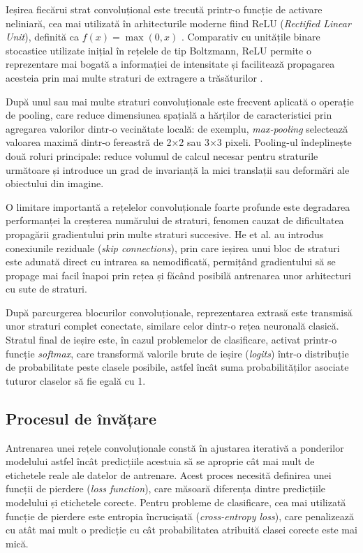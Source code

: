 Ieșirea fiecărui strat convoluțional este trecută printr-o funcție de activare neliniară, cea mai utilizată în arhitecturile moderne fiind ReLU (\textit{Rectified Linear Unit}), definită ca $f(x) = \max(0, x)$ \cite{nair2010rectified}. Comparativ cu unitățile binare stocastice utilizate inițial în rețelele de tip Boltzmann, ReLU permite o reprezentare mai bogată a informației de intensitate și facilitează propagarea acesteia prin mai multe straturi de extragere a trăsăturilor \cite{nair2010rectified}.

După unul sau mai multe straturi convoluționale este frecvent aplicată o operație de pooling, care reduce dimensiunea spațială a hărților de caracteristici prin agregarea valorilor dintr-o vecinătate locală: de exemplu, {\it max-pooling} selectează valoarea maximă dintr-o fereastră de 2×2 sau 3×3 pixeli. Pooling-ul îndeplinește două roluri principale: reduce volumul de calcul necesar pentru straturile următoare și introduce un grad de invarianță la mici translații sau deformări ale obiectului din imagine.

O limitare importantă a rețelelor convoluționale foarte profunde este degradarea performanței la creșterea numărului de straturi, fenomen cauzat de dificultatea propagării gradientului prin multe straturi succesive. He et al. \cite{he2016resnet} au introdus conexiunile reziduale (\textit{skip connections}), prin care ieșirea unui bloc de straturi este adunată direct cu intrarea sa nemodificată, permițând gradientului să se propage mai facil înapoi prin rețea și făcând posibilă antrenarea unor arhitecturi cu sute de straturi.

După parcurgerea blocurilor convoluționale, reprezentarea extrasă este transmisă unor straturi complet conectate, similare celor dintr-o rețea neuronală clasică. Stratul final de ieșire este, în cazul problemelor de clasificare, activat printr-o funcție {\it softmax}, care transformă valorile brute de ieșire (\textit{logits}) într-o distribuție de probabilitate peste clasele posibile, astfel încât suma probabilităților asociate tuturor claselor să fie egală cu 1.


\subsection{Procesul de învățare}

Antrenarea unei rețele convoluționale constă în ajustarea iterativă a ponderilor modelului astfel încât predicțiile acestuia să se aproprie cât mai mult de etichetele reale ale datelor de antrenare. Acest proces necesită definirea unei funcții de pierdere (\textit{loss function}), care măsoară diferența dintre predicțiile modelului și etichetele corecte. Pentru probleme de clasificare, cea mai utilizată funcție de pierdere este entropia încrucișată (\textit{cross-entropy loss}), care penalizează cu atât mai mult o predicție cu cât probabilitatea atribuită clasei corecte este mai mică.

